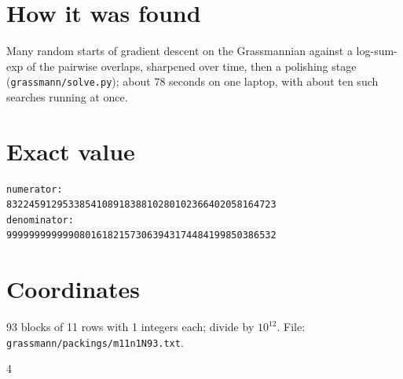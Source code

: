 \documentclass[11pt,a4paper]{article}
\begin{document}
\section{How it was found}
Many random starts of gradient descent on the Grassmannian against a log-sum-exp of the pairwise overlaps, sharpened over time, then a polishing stage (\texttt{grassmann/solve.py}); about 78 seconds on one laptop, with about ten such searches running at once.


\appendix
\section{Exact value}
{\small
\begin{verbatim}
numerator:
832245912953385410891838810280102366402058164723
denominator:
999999999999080161821573063943174484199850386532
\end{verbatim}}

\section{Coordinates}
93 blocks of 11 rows with 1 integers each; divide by $10^{12}$. File: \texttt{grassmann/packings/m11n1N93.txt}.
{\tiny
\begin{multicols}{4}
\end{multicols}}
\end{document}

